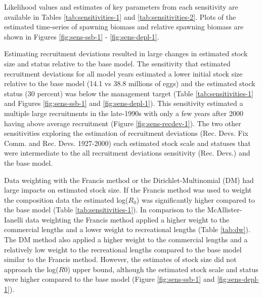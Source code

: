 \documentclass[11pt,
  english,
  a4paper,
]{article}
\begin{document}

Likelihood values and estimates of key parameters from each sensitivity are available in Tables \ref{tab:sensitivities-1} and \ref{tab:sensitivities-2}. Plots of the estimated time-series of spawning biomass and relative spawning biomass are shown in Figures \ref{fig:sens-ssb-1} - \ref{fig:sens-depl-1}.

\leavevmode\tagmcend\tagstructend\par


Estimating recruitment deviations resulted in large changes in estimated stock size and status relative to the base model. The sensitivity that estimated recruitment deviations for all model years estimated a lower initial stock size relative to the base model (14.1 vs 38.8 millions of eggs) and the estimated stock status (30 percent) was below the management target (Table \ref{tab:sensitivities-1} and Figures \ref{fig:sens-ssb-1} and \ref{fig:sens-depl-1}). This sensitivity estimated a multiple large recruitments in the late-1990s with only a few years after 2000 having above average recruitment (Figure \ref{fig:sens-recdev-1}). The two other sensitivities exploring the estimation of recruitment deviations (Rec. Devs. Fix Comm. and Rec. Devs. 1927-2000) each estimated stock scale and statuses that were intermediate to the all recruitment deviations sensitivity (Rec. Devs.) and the base model.

\leavevmode\tagmcend\tagstructend\par


Data weighting with the Francis method or the Dirichlet-Multinomial (DM) had large impacts on estimated stock size. If the Francis method was used to weight the composition data the estimated log({\(R_0\)\leavevmode\tagmcend\tagstructend}) was significantly higher compared to the base model (Table \ref{tab:sensitivities-1}). In comparison to the McAllister-Ianelli data weighting the Francis method applied a higher weight to the commercial lengths and a lower weight to recreational lengths (Table \ref{tab:dw}). The DM method also applied a higher weight to the commercial lengths and a relatively low weight to the recreational lengths compared to the base model similar to the Francis method. However, the estimates of stock size did not approach the log({\(R0\)\leavevmode\tagmcend\tagstructend}) upper bound, although the estimated stock scale and status were higher compared to the base model (Figure \ref{fig:sens-ssb-1} and \ref{fig:sens-depl-1}).
\end{document}
